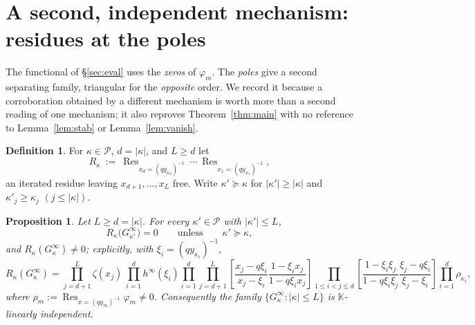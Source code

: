 \documentclass[11pt]{article}
\newtheorem{prop}[thm]{Proposition}
\theoremstyle{definition}
\newtheorem{defn}[thm]{Definition}
\theoremstyle{remark}
\DeclareMathOperator{\Res}{Res}
\newcommand{\KK}{\mathbb{K}}
\newcommand{\PP}{\mathcal{P}}
\newcommand{\Gi}[1]{G^{\infty}_{#1}}
\begin{document}
\section{A second, independent mechanism: residues at the poles}\label{sec:res}

The functional of \S\ref{sec:eval} uses the \emph{zeros} of $\varphi_m$. The \emph{poles} give a
second separating family, triangular for the \emph{opposite} order. We record it because a
corroboration obtained by a different mechanism is worth more than a second reading of one
mechanism; it also reproves Theorem~\ref{thm:main} with no reference to Lemma~\ref{lem:stab} or
Lemma~\ref{lem:vanish}.

\begin{defn}
For $\kappa\in\PP$, $d=|\kappa|$, and $L\ge d$ let
\[
  R_\kappa\ :=\ \Res_{x_d=(qy_{\kappa_d})^{-1}}\ \cdots\ \Res_{x_1=(qy_{\kappa_1})^{-1}} ,
\]
an iterated residue leaving $x_{d+1},\dots,x_L$ free. Write $\kappa'\succeq\kappa$ for
$|\kappa'|\ge|\kappa|$ and $\kappa'_j\ge\kappa_j$ $(j\le|\kappa|)$.
\end{defn}

\begin{prop}\label{prop:res}
Let $L\ge d=|\kappa|$. For every $\kappa'\in\PP$ with $|\kappa'|\le L$,
\[
  R_\kappa\bigl(\Gi{\kappa'}\bigr)=0\qquad\text{unless}\qquad \kappa'\succeq\kappa ,
\]
and $R_\kappa(\Gi{\kappa})\ne0$; explicitly, with $\xi_i=(qy_{\kappa_i})^{-1}$,
\[
  R_\kappa(\Gi\kappa)=\prod_{j=d+1}^{L}\zeta(x_j)\ \prod_{i=1}^d h^\infty(\xi_i)
  \prod_{i=1}^{d}\prod_{j=d+1}^{L}\left[\frac{x_j-q\xi_i}{x_j-\xi_i}\frac{1-\xi_ix_j}{1-q\xi_ix_j}\right]
  \prod_{1\le i<j\le d}\left[\frac{1-\xi_i\xi_j}{1-q\xi_i\xi_j}\frac{\xi_j-q\xi_i}{\xi_j-\xi_i}\right]
  \prod_{i=1}^{d}\rho_{\kappa_i},
\]
where $\rho_m:=\Res_{x=(qy_m)^{-1}}\varphi_m\ne0$. Consequently the family
$\{\Gi\kappa:|\kappa|\le L\}$ is $\KK$-linearly independent.
\end{prop}
\end{document}

